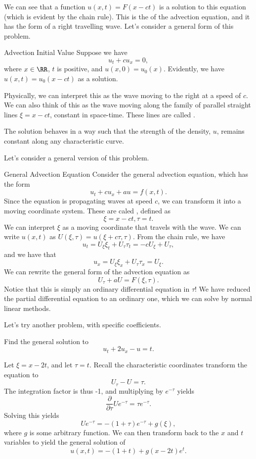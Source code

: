 We can see that a function $u(x,t) = F(x - ct)$ is a solution to this equation (which is evident by the chain rule). This is the  of the advection equation, and it has the form of a right travelling wave. Let's consider a general form of this problem.
\begin{example}{Advection Initial Value}{}
Suppose we have 
\[ u_t + cu_x = 0, \] where $x \in \RR$, $t$ is positive, and $u(x,0) = u_0(x)$. Evidently, we have $u(x,t) = u_0(x - ct)$ as a solution. 
\end{example}
Physically, we can interpret this as the wave moving to the right at a speed of $c$. We can also think of this as the wave moving along the family of parallel straight lines $\xi = x - ct$, constant in space-time. These lines are called . 

The solution behaves in a way such that the strength of the density, $u$, remains constant along any characteristic curve. 

Let's consider a general version of this problem. 
\begin{example}{General Advection Equation}{}
Consider the general advection equation, which has the form 
\[ u_t + cu_x + au = f(x,t). \] 
Since the equation is propagating waves at speed $c$, we can transform it into a moving coordinate system. These are caled , defined as 
\[ \xi = x - ct, \tau = t. \] We can interpret $\xi$ as a moving coordinate that travels with the wave. We can write $u(x,t)$ as $U(\xi, \tau) = u(\xi+c\tau, \tau)$. From the chain rule, we have 
\[ u_t = U_\xi\xi_t + U_\tau\tau_t = -cU_\xi + U_\tau, \] and we have that 
\[ u_x = U_\xi\xi_x + U_\tau\tau_x = U_\xi. \] We can rewrite the general form of the advection equation as 
\[ U_\tau + aU = F(\xi, \tau). \] Notice that this is simply an ordinary differential equation in $\tau$! We have reduced the partial differential equation to an ordinary one, which we can solve by normal linear methods. 
\end{example}

Let's try another problem, with specific coefficients. 
\begin{exercise}
Find the general solution to 
\[ u_t + 2u_x - u = t. \] 
\end{exercise}
\begin{sol}
Let $\xi = x - 2t$, and let $\tau = t$. Recall the characteristic coordinates transform the equation to 
\[ U_\tau - U = \tau. \] 	The integration factor is thus -1, and multiplying by $e^{-\tau}$ yields 
\[ \frac{\partial}{\partial \tau}Ue^{-\tau} = \tau e^{-\tau}. \] Solving this yields 
\[ Ue^{-\tau} = -(1 + \tau)e^{-\tau} + g(\xi), \] where $g$ is some arbitrary function. We can then transform back to the $x$ and $t$ variables to yield the general solution of 
\[ \boxed{u(x,t) = -(1+t) + g(x - 2t)e^t}. \] 
\end{sol}

